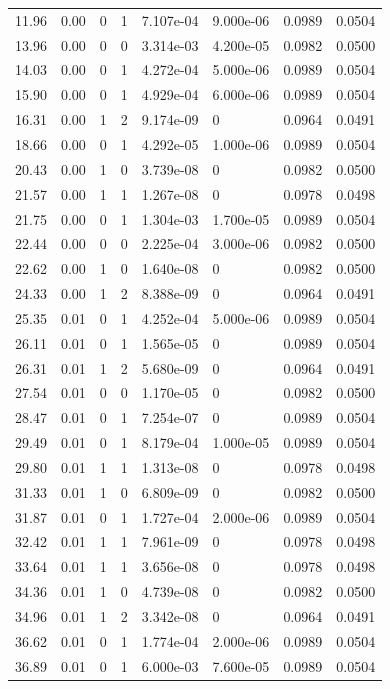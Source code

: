 \documentclass[preview]{standalone}
\begin{document}
{{\begin{tabular}{L{1.2cm}C{1.2cm} C{0.3cm}C{0.5cm} C{1.4cm}C{1.4cm} C{1.4cm}C{1.4cm}}
  11.96  &  0.00  & 0     &  1 &  7.107e-04  & 9.000e-06  & 0.0989 &  0.0504   \\ 
  13.96  &  0.00  & 0     &  0 &  3.314e-03  & 4.200e-05  & 0.0982 &  0.0500   \\ 
  14.03  &  0.00  & 0     &  1 &  4.272e-04  & 5.000e-06  & 0.0989 &  0.0504   \\ 
  15.90  &  0.00  & 0     &  1 &  4.929e-04  & 6.000e-06  & 0.0989 &  0.0504   \\ 
  16.31  &  0.00  & 1     &  2 &  9.174e-09  & 0  & 0.0964 &  0.0491   \\ 
  18.66  &  0.00  & 0     &  1 &  4.292e-05  & 1.000e-06  & 0.0989 &  0.0504   \\ 
  20.43  &  0.00  & 1     &  0 &  3.739e-08  & 0  & 0.0982 &  0.0500   \\ 
  21.57  &  0.00  & 1     &  1 &  1.267e-08  & 0  & 0.0978 &  0.0498   \\ 
  21.75  &  0.00  & 0     &  1 &  1.304e-03  & 1.700e-05  & 0.0989 &  0.0504   \\ 
  22.44  &  0.00  & 0     &  0 &  2.225e-04  & 3.000e-06  & 0.0982 &  0.0500   \\ 
  22.62  &  0.00  & 1     &  0 &  1.640e-08  & 0  & 0.0982 &  0.0500   \\ 
  24.33  &  0.00  & 1     &  2 &  8.388e-09  & 0  & 0.0964 &  0.0491   \\ 
  25.35  &  0.01  & 0     &  1 &  4.252e-04  & 5.000e-06  & 0.0989 &  0.0504   \\ 
  26.11  &  0.01  & 0     &  1 &  1.565e-05  & 0  & 0.0989 &  0.0504   \\ 
  26.31  &  0.01  & 1     &  2 &  5.680e-09  & 0  & 0.0964 &  0.0491   \\ 
  27.54  &  0.01  & 0     &  0 &  1.170e-05  & 0  & 0.0982 &  0.0500   \\ 
  28.47  &  0.01  & 0     &  1 &  7.254e-07  & 0  & 0.0989 &  0.0504   \\ 
  29.49  &  0.01  & 0     &  1 &  8.179e-04  & 1.000e-05  & 0.0989 &  0.0504   \\ 
  29.80  &  0.01  & 1     &  1 &  1.313e-08  & 0  & 0.0978 &  0.0498   \\ 
  31.33  &  0.01  & 1     &  0 &  6.809e-09  & 0  & 0.0982 &  0.0500   \\ 
  31.87  &  0.01  & 0     &  1 &  1.727e-04  & 2.000e-06  & 0.0989 &  0.0504   \\ 
  32.42  &  0.01  & 1     &  1 &  7.961e-09  & 0  & 0.0978 &  0.0498   \\ 
  33.64  &  0.01  & 1     &  1 &  3.656e-08  & 0  & 0.0978 &  0.0498   \\ 
  34.36  &  0.01  & 1     &  0 &  4.739e-08  & 0  & 0.0982 &  0.0500   \\ 
  34.96  &  0.01  & 1     &  2 &  3.342e-08  & 0  & 0.0964 &  0.0491   \\ 
  36.62  &  0.01  & 0     &  1 &  1.774e-04  & 2.000e-06  & 0.0989 &  0.0504   \\ 
  36.89  &  0.01  & 0     &  1 &  6.000e-03  & 7.600e-05  & 0.0989 &  0.0504   \\ 
\hline 
\end{tabular} 

}}
\end{document}
